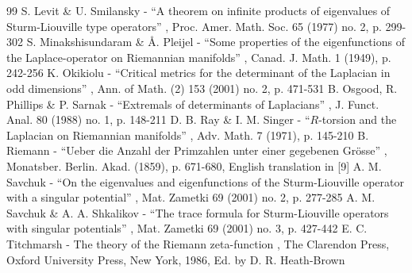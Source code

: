 \documentclass[10pt,a4paper]{amsart}
\theoremstyle{plain}
\theoremstyle{definition}
\begin{document}
\begin{thebibliography}{99}
 S. Levit \& U. Smilansky - “A theorem on infinite products of eigenvalues of Sturm-Liouville type operators” , Proc. Amer. Math. Soc. 65 (1977) no. 2, p. 299-302
 S. Minakshisundaram \& Å. Pleijel - “Some properties of the eigenfunctions of the Laplace-operator on Riemannian manifolds” , Canad. J. Math. 1 (1949), p. 242-256
 K. Okikiolu - “Critical metrics for the determinant of the Laplacian in odd dimensions” , Ann. of Math. (2) 153 (2001) no. 2, p. 471-531
 B. Osgood, R. Phillips \& P. Sarnak - “Extremals of determinants of Laplacians” , J. Funct. Anal. 80 (1988) no. 1, p. 148-211
 D. B. Ray \& I. M. Singer - “$R$-torsion and the Laplacian on Riemannian manifolds” , Adv. Math. 7 (1971), p. 145-210
 B. Riemann - “Ueber die Anzahl der Primzahlen unter einer gegebenen Grösse” , Monatsber. Berlin. Akad. (1859), p. 671-680, English translation in [9]
 A. M. Savchuk - “On the eigenvalues and eigenfunctions of the Sturm-Liouville operator with a singular potential” , Mat. Zametki 69 (2001) no. 2, p. 277-285
 A. M. Savchuk \& A. A. Shkalikov - “The trace formula for Sturm-Liouville operators with singular potentials” , Mat. Zametki 69 (2001) no. 3, p. 427-442
 E. C. Titchmarsh - The theory of the Riemann zeta-function , The Clarendon Press, Oxford University Press, New York, 1986, Ed. by D. R. Heath-Brown
\end{thebibliography}
\end{document}
